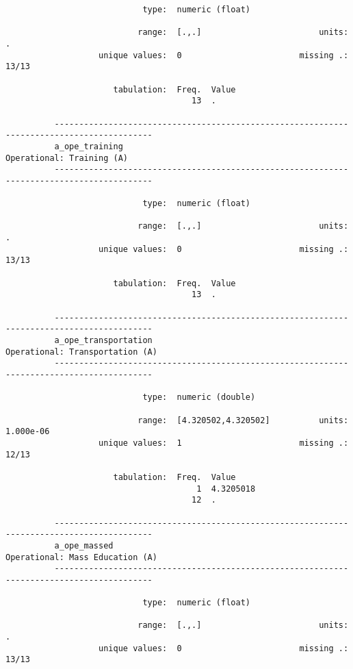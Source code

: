 \documentclass{article}
\begin{document}
\begin{verbatim}
                            type:  numeric (float)
          
                           range:  [.,.]                        units:  .
                   unique values:  0                        missing .:  13/13
          
                      tabulation:  Freq.  Value
                                      13  .
          
          ------------------------------------------------------------------------------------------
          a_ope_training                                                   Operational: Training (A)
          ------------------------------------------------------------------------------------------
          
                            type:  numeric (float)
          
                           range:  [.,.]                        units:  .
                   unique values:  0                        missing .:  13/13
          
                      tabulation:  Freq.  Value
                                      13  .
          
          ------------------------------------------------------------------------------------------
          a_ope_transportation                                       Operational: Transportation (A)
          ------------------------------------------------------------------------------------------
          
                            type:  numeric (double)
          
                           range:  [4.320502,4.320502]          units:  1.000e-06
                   unique values:  1                        missing .:  12/13
          
                      tabulation:  Freq.  Value
                                       1  4.3205018
                                      12  .
          
          ------------------------------------------------------------------------------------------
          a_ope_massed                                               Operational: Mass Education (A)
          ------------------------------------------------------------------------------------------
          
                            type:  numeric (float)
          
                           range:  [.,.]                        units:  .
                   unique values:  0                        missing .:  13/13
          

\end{verbatim}
\end{document}
